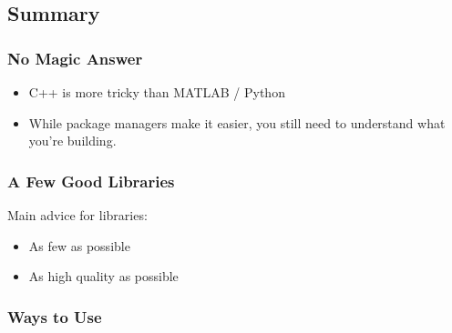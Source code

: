 \subsection{Summary}\label{summary-2}

\subsubsection{No Magic Answer}\label{no-magic-answer}

\begin{itemize}
\itemsep1pt\parskip0pt
\item
  C++ is more tricky than MATLAB / Python
\item
  While package managers make it easier, you still need to understand
  what you're building.
\end{itemize}

\subsubsection{A Few Good Libraries}\label{a-few-good-libraries-1}

Main advice for libraries:

\begin{itemize}
\itemsep1pt\parskip0pt
\item
  As few as possible
\item
  As high quality as possible
\end{itemize}

\subsubsection{Ways to Use}\label{ways-to-use}

